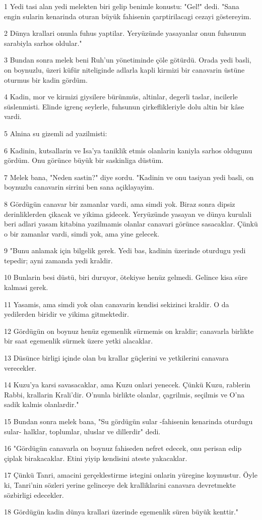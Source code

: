 \par 1 Yedi tasi alan yedi melekten biri gelip benimle konustu: "Gel!" dedi. "Sana engin sularin kenarinda oturan büyük fahisenin çarptirilacagi cezayi göstereyim.
\par 2 Dünya krallari onunla fuhus yaptilar. Yeryüzünde yasayanlar onun fuhsunun sarabiyla sarhos oldular."
\par 3 Bundan sonra melek beni Ruh'un yönetiminde çöle götürdü. Orada yedi basli, on boynuzlu, üzeri küfür niteliginde adlarla kapli kirmizi bir canavarin üstüne oturmus bir kadin gördüm.
\par 4 Kadin, mor ve kirmizi giysilere bürünmüs, altinlar, degerli taslar, incilerle süslenmisti. Elinde igrenç seylerle, fuhsunun çirkeflikleriyle dolu altin bir kâse vardi.
\par 5 Alnina su gizemli ad yazilmisti:
\par 6 Kadinin, kutsallarin ve Isa'ya taniklik etmis olanlarin kaniyla sarhos oldugunu gördüm. Onu görünce büyük bir saskinliga düstüm.
\par 7 Melek bana, "Neden sastin?" diye sordu. "Kadinin ve onu tasiyan yedi basli, on boynuzlu canavarin sirrini ben sana açiklayayim.
\par 8 Gördügün canavar bir zamanlar vardi, ama simdi yok. Biraz sonra dipsiz derinliklerden çikacak ve yikima gidecek. Yeryüzünde yasayan ve dünya kurulali beri adlari yasam kitabina yazilmamis olanlar canavari görünce sasacaklar. Çünkü o bir zamanlar vardi, simdi yok, ama yine gelecek.
\par 9 "Bunu anlamak için bilgelik gerek. Yedi bas, kadinin üzerinde oturdugu yedi tepedir; ayni zamanda yedi kraldir.
\par 10 Bunlarin besi düstü, biri duruyor, ötekiyse henüz gelmedi. Gelince kisa süre kalmasi gerek.
\par 11 Yasamis, ama simdi yok olan canavarin kendisi sekizinci kraldir. O da yedilerden biridir ve yikima gitmektedir.
\par 12 Gördügün on boynuz henüz egemenlik sürmemis on kraldir; canavarla birlikte bir saat egemenlik sürmek üzere yetki alacaklar.
\par 13 Düsünce birligi içinde olan bu krallar güçlerini ve yetkilerini canavara verecekler.
\par 14 Kuzu'ya karsi savasacaklar, ama Kuzu onlari yenecek. Çünkü Kuzu, rablerin Rabbi, krallarin Krali'dir. O'nunla birlikte olanlar, çagrilmis, seçilmis ve O'na sadik kalmis olanlardir."
\par 15 Bundan sonra melek bana, "Su gördügün sular -fahisenin kenarinda oturdugu sular- halklar, toplumlar, uluslar ve dillerdir" dedi.
\par 16 "Gördügün canavarla on boynuz fahiseden nefret edecek, onu perisan edip çiplak birakacaklar. Etini yiyip kendisini ateste yakacaklar.
\par 17 Çünkü Tanri, amacini gerçeklestirme istegini onlarin yüregine koymustur. Öyle ki, Tanri'nin sözleri yerine gelinceye dek kralliklarini canavara devretmekte sözbirligi edecekler.
\par 18 Gördügün kadin dünya krallari üzerinde egemenlik süren büyük kenttir."


